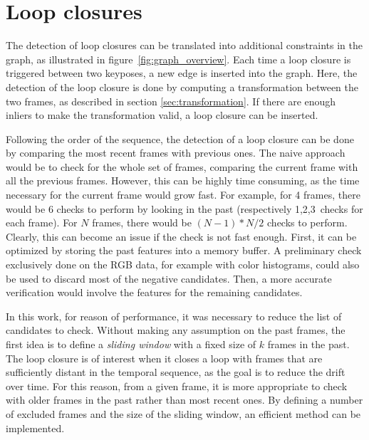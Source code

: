 \section{Loop closures}

The detection of loop closures can be translated into additional constraints in the graph, as illustrated in figure~\ref{fig:graph_overview}. Each time a loop closure is triggered between two keyposes, a new edge is inserted into the graph. Here, the detection of the loop closure is done by computing a transformation between the two frames, as described in section \ref{sec:transformation}. If there are enough inliers to make the transformation valid, a loop closure can be inserted.

Following the order of the sequence, the detection of a loop closure can be done by comparing the most recent frames with previous ones. The naive approach would be to check for the whole set of frames, comparing the current frame with all the previous frames. However, this can be highly time consuming, as the time necessary for the current frame would grow fast. For example, for 4 frames, there would be 6 checks to perform by looking in the past (respectively 1,2,3~checks for each frame). For $N$ frames, there would be $(N-1)*N/2$ checks to perform. Clearly, this can become an issue if the check is not fast enough. First, it can be optimized by storing the past features into a memory buffer. A preliminary check exclusively done on the RGB data, for example with color histograms, could also be used to discard most of the negative candidates. Then, a more accurate verification would involve the features for the remaining candidates.

In this work, for reason of performance, it was necessary to reduce the list of candidates to check. Without making any assumption on the past frames, the first idea is  to define a \emph{sliding window} with a fixed size of $k$ frames in the past. The loop closure is of interest when it closes a loop with frames that are sufficiently distant in the temporal sequence, as the goal is to reduce the drift over time. For this reason, from a given frame, it is more  appropriate to check with older frames in the past rather than most recent ones. By defining a number of excluded frames and the size of the sliding window, an efficient method can be implemented.

